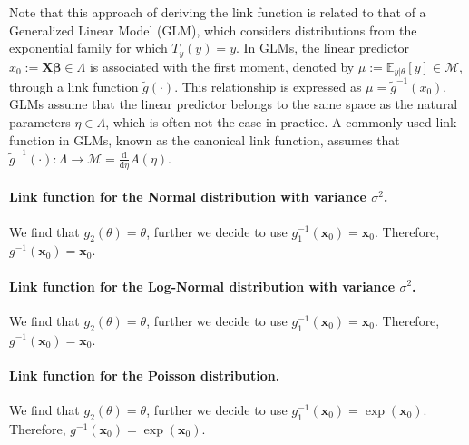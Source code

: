Note that this approach of deriving the link function is related to that of a Generalized Linear Model (GLM), which considers distributions from the exponential family for which $T_y(y) = y$. In GLMs, the linear predictor $x_0 :=\mathbf{X} \boldsymbol{\beta} \in \Lambda$ is associated with the first moment, denoted by $\mu := \mathbb{E}_{y|\theta}[y] \in  \mathcal{M} $, through a link function $\tilde{g}(\cdot)$. This relationship is expressed as $\mu = \tilde{g}^{-1}(x_0)$. 
GLMs assume that the linear predictor belongs to the same space as the natural parameters $\eta \in \Lambda$, which is often not the case in practice.
A commonly used link function in GLMs, known as the canonical link function, assumes that $\tilde{g}^{-1}(\cdot): \Lambda \to \mathcal{M} =  \frac{\mathrm{d}}{\mathrm{d}\eta }A(\eta)$.

\paragraph{Link function for the Normal distribution with variance $\sigma^2$.} We find that $g_2(\theta) = \theta$, further we decide to use $g^{-1}_1(\mathbf{x}_0) = \mathbf{x}_0$. Therefore, $g^{-1}(\mathbf{x}_0) = \mathbf{x}_0$.

\paragraph{Link function for the Log-Normal distribution with variance $\sigma^2$.} We find that $g_2(\theta) = \theta$, further we decide to use $g^{-1}_1(\mathbf{x}_0) = \mathbf{x}_0$. Therefore, $g^{-1}(\mathbf{x}_0) = \mathbf{x}_0$.

\paragraph{Link function for the Poisson distribution.} We find that $g_2(\theta) = \theta$, further we decide to use $g^{-1}_1(\mathbf{x}_0) = \exp(\mathbf{x}_0)$. Therefore, $g^{-1}(\mathbf{x}_0) = \exp(\mathbf{x}_0)$.

